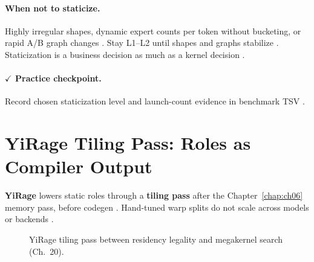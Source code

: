 \paragraph{When not to staticize.}
Highly irregular shapes, dynamic expert counts per token without bucketing, or rapid A/B graph changes \citep{liu2024deepseekv3,patel2025llminference,mpk2025}.
Stay L1--L2 until shapes and graphs stabilize \citep{nvidia2024cudagraphs,yirage2026,taxbreak2026}.
Staticization is a business decision as much as a kernel decision \citep{patel2025llminference,chen2020compilerbasedhardw}.

\paragraph{$\checkmark$ Practice checkpoint.}
Record chosen staticization level and launch-count evidence in benchmark TSV \citep{taxbreak2026,nvidia2024cudagraphs}.

\section{YiRage Tiling Pass: Roles as Compiler Output}
\label{sec:ch07_yirage_tiling}

\textbf{YiRage} lowers static roles through a \textbf{tiling pass} after the Chapter~\ref{chap:ch06} memory pass, before codegen \citep{yirage2026,wu2024mirage}.
Hand-tuned warp splits do not scale across models or backends \citep{patel2025llminference,chen2020compilerbasedhardw}.

\begin{figure}[t]
\centering
{}
\caption{YiRage tiling pass between residency legality and megakernel search (Ch.~20).}
\label{fig:ch07_yirage_tiling_pass}
\end{figure}

